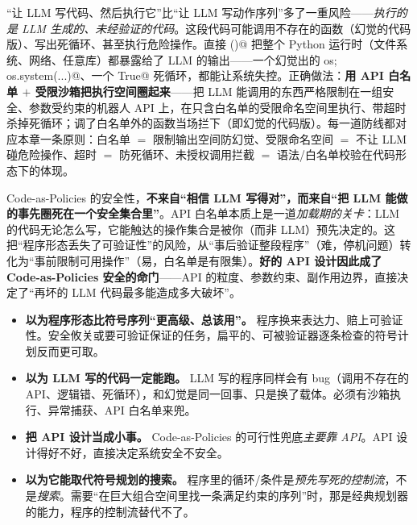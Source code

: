 “让 LLM 写代码、然后执行它”比“让 LLM 写动作序列”多了一重风险——\emph{执行的是 LLM 生成的、未经验证的代码}。这段代码可能调用不存在的函数（幻觉的代码版）、写出死循环、甚至执行危险操作。直接 \verb@exec()@ 把整个 Python 运行时（文件系统、网络、任意库）都暴露给了 LLM 的输出——一个幻觉出的 \verb@import os; os.system(...)@、一个 \verb@while True@ 死循环，都能让系统失控。正确做法：\textbf{用 API 白名单 $+$ 受限沙箱把执行空间圈起来}——把 LLM 能调用的东西严格限制在一组安全、参数受约束的机器人 API 上，在只含白名单的受限命名空间里执行、带超时杀掉死循环；调了白名单外的函数当场拦下（即幻觉的代码版）。每一道防线都对应本章一条原则：白名单 $=$ 限制输出空间防幻觉、受限命名空间 $=$ 不让 LLM 碰危险操作、超时 $=$ 防死循环、未授权调用拦截 $=$ 语法/白名单校验在代码形态下的体现。

\begin{insight}
Code-as-Policies 的安全性，\textbf{不来自“相信 LLM 写得对”，而来自“把 LLM 能做的事先圈死在一个安全集合里”}。API 白名单本质上是一道\emph{加载期的关卡}：LLM 的代码无论怎么写，它能触达的操作集合是被你（而非 LLM）预先决定的。这把“程序形态丢失了可验证性”的风险，从“事后验证整段程序”（难，停机问题）转化为“事前限制可用操作”（易，白名单是有限集）。\textbf{好的 API 设计因此成了 Code-as-Policies 安全的命门}——API 的粒度、参数约束、副作用边界，直接决定了“再坏的 LLM 代码最多能造成多大破坏”。
\end{insight}

\begin{pitfall}[本节常见陷阱]
\begin{itemize}
  \item \textbf{以为程序形态比符号序列“更高级、总该用”。} 程序换来表达力、赔上可验证性。安全攸关或要可验证保证的任务，扁平的、可被验证器逐条检查的符号计划反而更可取。
  \item \textbf{以为 LLM 写的代码一定能跑。} LLM 写的程序同样会有 bug（调用不存在的 API、逻辑错、死循环），和幻觉是同一回事、只是换了载体。必须有沙箱执行、异常捕获、API 白名单来兜。
  \item \textbf{把 API 设计当成小事。} Code-as-Policies 的可行性兜底\emph{主要靠 API}。API 设计得好不好，直接决定系统安全不安全。
  \item \textbf{以为它能取代符号规划的搜索。} 程序里的循环/条件是\emph{预先写死的控制流}，不是\emph{搜索}。需要“在巨大组合空间里找一条满足约束的序列”时，那是经典规划器的能力，程序的控制流替代不了。
\end{itemize}
\end{pitfall}

